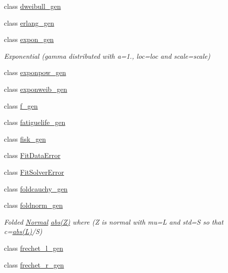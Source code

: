 \begin{DoxyCompactItemize}
\item 
class \hyperlink{classscipy_1_1stats_1_1__continuous__distns_1_1dweibull__gen}{dweibull\+\_\+gen}
\item 
class \hyperlink{classscipy_1_1stats_1_1__continuous__distns_1_1erlang__gen}{erlang\+\_\+gen}
\item 
class \hyperlink{classscipy_1_1stats_1_1__continuous__distns_1_1expon__gen}{expon\+\_\+gen}
\begin{DoxyCompactList}\small\item\em Exponential (gamma distributed with a=1., loc=loc and scale=scale) \end{DoxyCompactList}\item 
class \hyperlink{classscipy_1_1stats_1_1__continuous__distns_1_1exponpow__gen}{exponpow\+\_\+gen}
\item 
class \hyperlink{classscipy_1_1stats_1_1__continuous__distns_1_1exponweib__gen}{exponweib\+\_\+gen}
\item 
class \hyperlink{classscipy_1_1stats_1_1__continuous__distns_1_1f__gen}{f\+\_\+gen}
\item 
class \hyperlink{classscipy_1_1stats_1_1__continuous__distns_1_1fatiguelife__gen}{fatiguelife\+\_\+gen}
\item 
class \hyperlink{classscipy_1_1stats_1_1__continuous__distns_1_1fisk__gen}{fisk\+\_\+gen}
\item 
class \hyperlink{classscipy_1_1stats_1_1__continuous__distns_1_1FitDataError}{Fit\+Data\+Error}
\item 
class \hyperlink{classscipy_1_1stats_1_1__continuous__distns_1_1FitSolverError}{Fit\+Solver\+Error}
\item 
class \hyperlink{classscipy_1_1stats_1_1__continuous__distns_1_1foldcauchy__gen}{foldcauchy\+\_\+gen}
\item 
class \hyperlink{classscipy_1_1stats_1_1__continuous__distns_1_1foldnorm__gen}{foldnorm\+\_\+gen}
\begin{DoxyCompactList}\small\item\em Folded \hyperlink{classNormal}{Normal} \hyperlink{slamch_8c_a3aa069ac3980707dae1e0530f50d59e4}{abs(\+Z)} where (Z is normal with mu=L and std=S so that c=\hyperlink{slamch_8c_a3aa069ac3980707dae1e0530f50d59e4}{abs(\+L)}/\+S) \end{DoxyCompactList}\item 
class \hyperlink{classscipy_1_1stats_1_1__continuous__distns_1_1frechet__l__gen}{frechet\+\_\+l\+\_\+gen}
\item 
class \hyperlink{classscipy_1_1stats_1_1__continuous__distns_1_1frechet__r__gen}{frechet\+\_\+r\+\_\+gen}

\end{DoxyCompactItemize}
